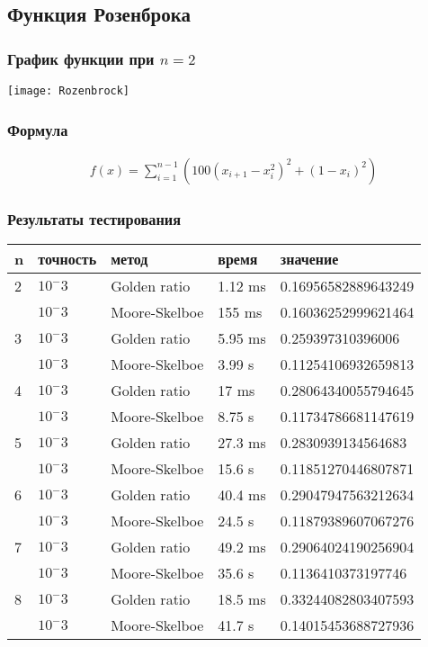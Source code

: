 \documentclass{article}
\begin{document}
    \subsection{Функция Розенброка}

    \subsubsection{График функции при $n=2$}
    \texttt{[image: Rozenbrock]}

    \subsubsection{Формула}
    \begin{gather*}
        f(x)=\sum_{i=1}^{n-1}\left(100\left(x_{i+1}-x_i^2\right)^2+\left(1-x_i\right)^2\right)
    \end{gather*}

    \subsubsection{Результаты тестирования}

    \begin{tabular}{ |p{2cm}|p{2cm}|p{3cm}|p{2cm}|p{4cm}|  }
        \hline
        n & точность & метод         & время   & значение            \\
        \hline
        2 & $10^-3$  & Golden ratio  & 1.12 ms & 0.16956582889643249 \\\cline{2-5}
        & $10^-3$  & Moore-Skelboe & 155 ms  & 0.16036252999621464 \\
        \hline
        3 & $10^-3$  & Golden ratio  & 5.95 ms & 0.259397310396006   \\\cline{2-5}
        & $10^-3$  & Moore-Skelboe & 3.99 s  & 0.11254106932659813 \\
        \hline
        4 & $10^-3$  & Golden ratio  & 17 ms   & 0.28064340055794645 \\\cline{2-5}
        & $10^-3$  & Moore-Skelboe & 8.75 s  & 0.11734786681147619 \\
        \hline
        5 & $10^-3$  & Golden ratio  & 27.3 ms & 0.2830939134564683  \\\cline{2-5}
        & $10^-3$  & Moore-Skelboe & 15.6 s  & 0.11851270446807871 \\
        \hline
        6 & $10^-3$  & Golden ratio  & 40.4 ms & 0.29047947563212634 \\\cline{2-5}
        & $10^-3$  & Moore-Skelboe & 24.5 s  & 0.11879389607067276 \\
        \hline
        7 & $10^-3$  & Golden ratio  & 49.2 ms & 0.29064024190256904 \\\cline{2-5}
        & $10^-3$  & Moore-Skelboe & 35.6 s  & 0.1136410373197746  \\
        \hline
        8 & $10^-3$  & Golden ratio  & 18.5 ms & 0.33244082803407593 \\\cline{2-5}
        & $10^-3$  & Moore-Skelboe & 41.7 s  & 0.14015453688727936 \\
        \hline

    \end{tabular}
\end{document}
